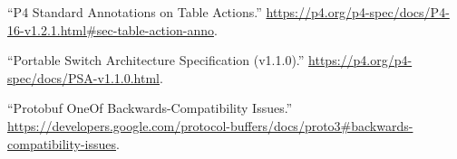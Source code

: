 \documentclass[11pt]{article}
\begin{document}
{{\begin{thebibliography}{40}
\mdbibitemlabel{{}[19]}\textquotedblleft{}P4 Standard Annotations on Table Actions.\textquotedblright{} \href{https://p4.org/p4-spec/docs/P4-16-v1.2.1.html\%23sec-table-action-anno}{{\ttfamily https://\hspace{0pt}p4.\hspace{0pt}org/\hspace{0pt}p4-\hspace{0pt}spec/\hspace{0pt}docs/\hspace{0pt}P4-\hspace{0pt}16-\hspace{0pt}v1.\hspace{0pt}2.\hspace{0pt}1.\hspace{0pt}html\#\hspace{0pt}sec-\hspace{0pt}table-\hspace{0pt}action-\hspace{0pt}anno}}.\label{p4actionannotations}%

\mdbibitemlabel{{}[20]}\textquotedblleft{}Portable Switch Architecture Specification (v1.1.0).\textquotedblright{} \href{https://p4.org/p4-spec/docs/PSA-v1.1.0.html}{{\ttfamily https://\hspace{0pt}p4.\hspace{0pt}org/\hspace{0pt}p4-\hspace{0pt}spec/\hspace{0pt}docs/\hspace{0pt}PSA-\hspace{0pt}v1.\hspace{0pt}1.\hspace{0pt}0.\hspace{0pt}html}}.\label{psa}%

\mdbibitemlabel{{}[21]}\textquotedblleft{}Protobuf OneOf Backwards-Compatibility Issues.\textquotedblright{} \href{https://developers.google.com/protocol-buffers/docs/proto3\%23backwards-compatibility-issues}{{\ttfamily https://\hspace{0pt}developers.\hspace{0pt}google.\hspace{0pt}com/\hspace{0pt}protocol-\hspace{0pt}buffers/\hspace{0pt}docs/\hspace{0pt}proto3\#\hspace{0pt}backwards-\hspace{0pt}compatibility-\hspace{0pt}issues}}.\label{protooneofbackwardscompatibility}%


\end{thebibliography}}}
\end{document}
